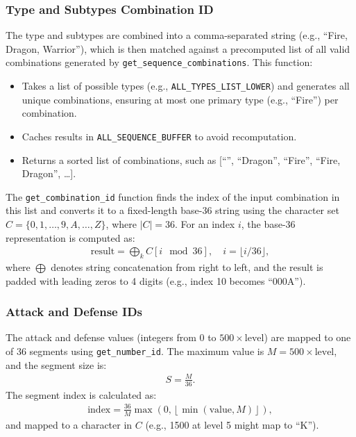 \subsubsection{Type and Subtypes Combination ID}
The type and subtypes are combined into a comma-separated string (e.g., ``Fire, Dragon, Warrior''), which is then matched against a precomputed list of all valid combinations generated by \texttt{get\_sequence\_combinations}. This function:
\begin{itemize}
	\item Takes a list of possible types (e.g., \texttt{ALL\_TYPES\_LIST\_LOWER}) and generates all unique combinations, ensuring at most one primary type (e.g., ``Fire'') per combination.
	\item Caches results in \texttt{ALL\_SEQUENCE\_BUFFER} to avoid recomputation.
	\item Returns a sorted list of combinations, such as [``'', ``Dragon'', ``Fire'', ``Fire, Dragon'', \ldots].
\end{itemize}
The \texttt{get\_combination\_id} function finds the index of the input combination in this list and converts it to a fixed-length base-36 string using the character set $C = \{0, 1, \ldots, 9, A, \ldots, Z\}$, where $|C| = 36$. For an index $i$, the base-36 representation is computed as:
\begin{align}
	\text{result} = \bigoplus_{k} C[i \mod 36], \quad i = \lfloor i / 36 \rfloor,
\end{align}
where $\bigoplus$ denotes string concatenation from right to left, and the result is padded with leading zeros to 4 digits (e.g., index 10 becomes ``000A'').

\subsubsection{Attack and Defense IDs}
The attack and defense values (integers from 0 to $500 \times \text{level}$) are mapped to one of 36 segments using \texttt{get\_number\_id}. The maximum value is $M = 500 \times \text{level}$, and the segment size is:
\begin{align}
S = \frac{M}{36}.
\end{align}
The segment index is calculated as:
\begin{align}
	\text{index} = \frac{36}{M}\max\left(0, \left\lfloor \min(\text{value}, M) \right\rfloor\right),
\end{align}
and mapped to a character in $C$ (e.g., 1500 at level 5 might map to ``K'').

